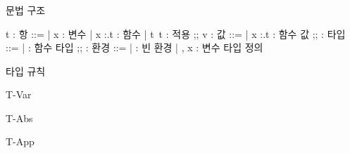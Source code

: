 \documentclass{beamer}
\begin{document}
\begin{frame}[c, fragile]
  \frametitle{}

  \begin{minipage}[t]{0.49\linewidth}
    문법 구조
    \begin{center}
      \def\typecolon{{:}}
      \begin{bnf}
        t : 항 ::=
        | x : 변수
        | \lambda x \typecolon \tau.t : 함수
        | t\ t : 적용
        ;;
        v : 값 ::=
        | \lambda x \typecolon \tau .t : 함수 값
        ;;
        \tau : 타입 ::=
        | \tau \to \tau : 함수 타입
        ;;
        \Gamma : 환경 ::=
        | \varnothing : 빈 환경
        | \Gamma, x \mathrel{\typecolon} \tau : 변수 타입 정의
      \end{bnf}
    \end{center}
  \end{minipage}
  \begin{minipage}[t]{0.49\linewidth}
    타입 규칙\hfill{}
    \begin{center}
      \begin{InfRule}{T-Var}
      \end{InfRule}
      \begin{InfRule}{T-Abs}
      \end{InfRule}
      \begin{InfRule}{T-App}
      \end{InfRule}
    \end{center}
  \end{minipage}
\end{frame}
\end{document}
